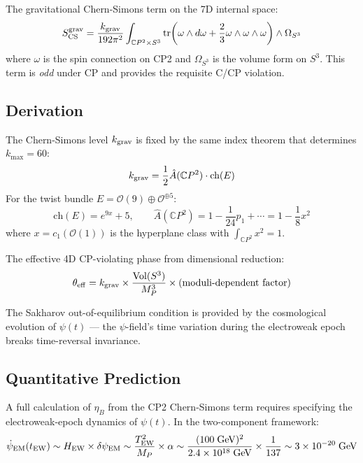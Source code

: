 \documentclass[11pt]{article}
\begin{document}
The gravitational Chern-Simons term on the 7D internal space:
\begin{equation}
S_{\rm CS}^{\rm grav} = \frac{k_{\rm grav}}{192\pi^2}\int_{\mathbb{C}P^2 \times S^3}
\text{tr}\!\left(\omega \wedge d\omega + \frac{2}{3}\omega \wedge \omega \wedge \omega\right)
\wedge \Omega_{S^3}
\end{equation}
where $\omega$ is the spin connection on CP2 and $\Omega_{S^3}$ is the
volume form on $S^3$.  This term is \emph{odd} under CP and provides
the requisite C/CP violation.

\subsection{Derivation}

The Chern-Simons level $k_{\rm grav}$ is fixed by the same index
theorem that determines $k_{\max} = 60$:
\begin{equation}
k_{\rm grav} = \frac{1}{2}\hat{A}(\mathbb{C}P^2) \cdot \text{ch}(E)
\end{equation}
For the twist bundle $E = \mathcal{O}(9) \oplus \mathcal{O}^{\oplus 5}$:
\begin{equation}
\text{ch}(E) = e^{9x} + 5, \qquad
\hat{A}(\mathbb{C}P^2) = 1 - \frac{1}{24}p_1 + \cdots = 1 - \frac{1}{8}x^2
\end{equation}
where $x = c_1(\mathcal{O}(1))$ is the hyperplane class with
$\int_{\mathbb{C}P^2} x^2 = 1$.

The effective 4D CP-violating phase from dimensional reduction:
\begin{equation}
\theta_{\rm eff} = k_{\rm grav} \times \frac{\text{Vol}(S^3)}{M_P^3}
\times \text{(moduli-dependent factor)}
\end{equation}

The Sakharov out-of-equilibrium condition is provided by the
cosmological evolution of $\psi(t)$ --- the $\psi$-field's time
variation during the electroweak epoch breaks time-reversal invariance.

\subsection{Quantitative Prediction}

A full calculation of $\eta_B$ from the CP2 Chern-Simons term requires
specifying the electroweak-epoch dynamics of $\psi(t)$.  In the
two-component framework:
\begin{equation}
\dot\psi_{\rm EM}(t_{\rm EW}) \sim H_{\rm EW} \times \delta\psi_{\rm EM}
\sim \frac{T_{\rm EW}^2}{M_P} \times \alpha \sim
\frac{(100\;\text{GeV})^2}{2.4 \times 10^{18}\;\text{GeV}} \times \frac{1}{137}
\sim 3 \times 10^{-20}\;\text{GeV}
\end{equation}
\end{document}

